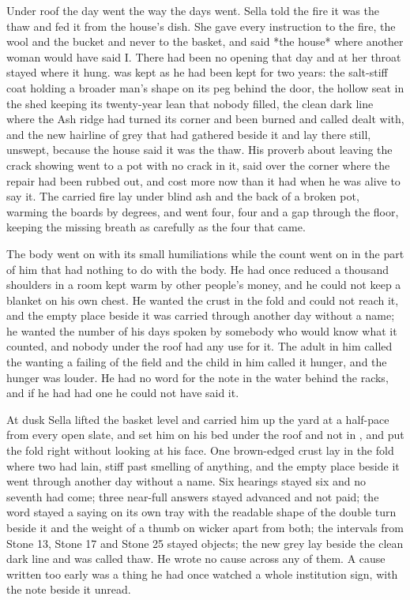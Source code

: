 Under  roof the day went the way the days went. Sella told the fire it was the thaw and fed it from the house's dish. She gave every instruction to the fire, the wool and the bucket and never to the basket, and said *the house* where another woman would have said I. There had been no opening that day and  at her throat stayed where it hung.  was kept as he had been kept for two years: the salt-stiff coat holding a broader man's shape on its peg behind the door, the hollow seat in the shed keeping its twenty-year lean that nobody filled, the clean dark line where the Ash ridge had turned its corner and been burned and called dealt with, and the new hairline of grey that had gathered beside it and lay there still, unswept, because the house said it was the thaw. His proverb about leaving the crack showing went to a pot with no crack in it, said over the corner where the repair had been rubbed out, and cost more now than it had when he was alive to say it. The carried fire lay under blind ash and the back of a broken pot, warming the boards by degrees, and  went four, four and a gap through the floor, keeping the missing breath as carefully as the four that came.

The body went on with its small humiliations while the count went on in the part of him that had nothing to do with the body. He had once reduced a thousand shoulders in a room kept warm by other people's money, and he could not keep a blanket on his own chest. He wanted the crust in the fold and could not reach it, and the empty place beside it was carried through another day without a name; he wanted the number of his days spoken by somebody who would know what it counted, and nobody under the roof had any use for it. The adult in him called the wanting a failing of the field and the child in him called it hunger, and the hunger was louder. He had no  word for the note in the water behind the racks, and if he had had one he could not have said it.

At dusk Sella lifted the basket level and carried him up the yard at a half-pace from every open slate, and set him on his bed under the roof and not in , and put the fold right without looking at his face. One brown-edged crust lay in the fold where two had lain, stiff past smelling of anything, and the empty place beside it went through another day without a name. Six hearings stayed six and no seventh had come; three near-full answers stayed advanced and not paid; the word stayed a saying on its own tray with the readable shape of the double turn beside it and the weight of a thumb on wicker apart from both; the intervals from Stone 13, Stone 17 and Stone 25 stayed objects; the new grey lay beside the clean dark line and was called thaw. He wrote no cause across any of them. A cause written too early was a thing he had once watched a whole institution sign, with the note beside it unread.

